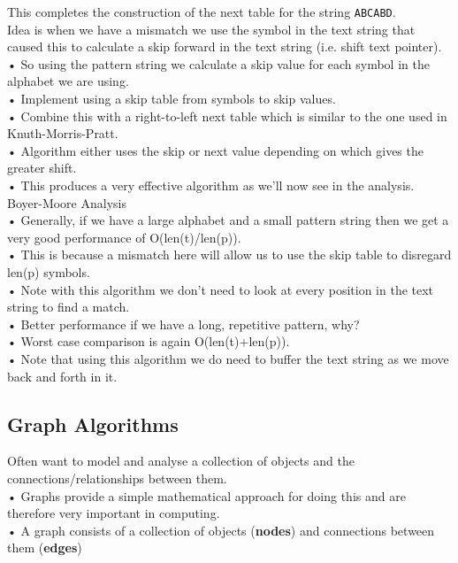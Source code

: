 \documentclass[a4paper,12pt]{article}
\begin{document}
This completes the construction of the next table for the string \texttt{ABCABD}.\\

Idea is when we have a mismatch we use the symbol in the text string that caused this to calculate a skip forward in the text string (i.e. shift text pointer).
• So using the pattern string we calculate a skip value for
each symbol in the alphabet we are using.\\
• Implement using a skip table from symbols to skip values.\\
• Combine this with a right-to-left next table which is similar
to the one used in Knuth-Morris-Pratt.\\
• Algorithm either uses the skip or next value depending on
which gives the greater shift.\\
• This produces a very effective algorithm as we’ll now see in
the analysis.\\

Boyer-Moore Analysis\\
• Generally, if we have a large alphabet and a small pattern
string then we get a very good performance of
O(len(t)/len(p)).\\
• This is because a mismatch here will allow us to use the
skip table to disregard len(p) symbols.\\
• Note with this algorithm we don’t need to look at every
position in the text string to find a match.\\
• Better performance if we have a long, repetitive pattern,
why?\\
• Worst case comparison is again O(len(t)+len(p)).\\
• Note that using this algorithm we do need to buffer the text
string as we move back and forth in it.\\

\subsection{Graph Algorithms}

Often want to model and analyse a collection of objects and
the connections/relationships between them.\\
• Graphs provide a simple mathematical approach for doing
this and are therefore very important in computing.\\
• A graph consists of a collection of objects (\textbf{nodes}) and
connections between them (\textbf{edges})\\
\end{document}
